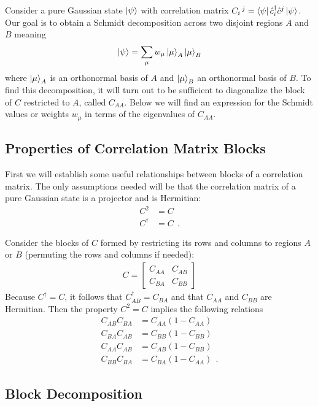 \documentclass[aps, superscriptaddress, floatfix, onecolumn]{revtex4-2}
\begin{document}
Consider a pure Gaussian state $\ket{\psi}$ with correlation matrix $C_i\,^j = \bra{\psi} \hat{c}^\dagger_i \hat{c}^j \ket{\psi}$. 
Our goal is to obtain a Schmidt decomposition across two disjoint regions $A$ and $B$ meaning 
\begin{align}
\ket{\psi} = \sum_\mu w_\mu \ket{\mu}_A \ket{\mu}_B
\end{align}
where $\ket{\mu}_A$ is an orthonormal basis of $A$ and  $\ket{\mu}_B$ an orthonormal basis of $B$. 
To find this decomposition, it will turn out to be sufficient to diagonalize the block of $C$ restricted to $A$, called $C_{AA}$. Below we will find an
expression for the Schmidt values or weights $w_\mu$ in terms of the eigenvalues of $C_{AA}$.

\subsection{Properties of Correlation Matrix Blocks}

First we will establish some useful relationships between blocks of a correlation matrix. The only assumptions needed will be that the correlation matrix of
a pure Gaussian state is a projector and is Hermitian:
\begin{align}
C^2 & = C \label{eq:projector} \\
C^\dagger & = C \ \ . \label{eq:hermitian}
\end{align}

Consider the blocks of $C$ formed by restricting its rows and columns to regions $A$ or $B$ (permuting the rows and columns if needed):
\begin{align}
C = \begin{bmatrix}
C_{AA} & C_{AB} \\ 
C_{BA} & C_{BB} 
\end{bmatrix}
\end{align}
Because $C^\dagger = C$, it follows that $C^\dagger_{AB} = C_{BA}$ and that $C_{AA}$ and $C_{BB}$ are Hermitian.
Then the property $C^2=C$ implies the following relations
\begin{align}
C_{AB} C_{BA} & = C_{AA} (1- C_{AA})  \label{eq:proj1} \\
C_{BA} C_{AB} & = C_{BB} (1 - C_{BB}) \\
C_{AA} C_{AB} & = C_{AB} (1 - C_{BB}) \\
C_{BB} C_{BA} & = C_{BA} (1 - C_{AA})  \ \ .
\end{align}

\subsection{Block Decomposition}
\end{document}
